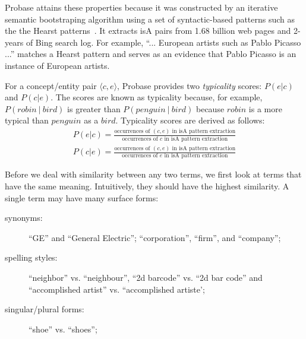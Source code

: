 Probase attains these properties because it was constructed by an
iterative semantic bootstraping algorithm using a set of
syntactic-based patterns such as the the Hearst
patterns~\cite{Hearst:Automatic}. It extracts isA pairs from 1.68
billion web pages and 2-years of Bing search log.
For example, ``... European artists such as Pablo Picasso ...'' matches a
Hearst pattern and serves as an evidence that Pablo Picasso is an instance of
European artists.

For a concept/entity pair $\langle c, e\rangle$, Probase provides
two {\it typicality} scores: $P(e|c)$ and $P(c|e)$.
The scores are known as typicality because, for example,
$P(robin~|~bird)$ is greater than $P(penguin~|~bird)$
because $robin$ is a more typical than $penguin$ as a $bird$.
Typicality scores are derived as follows:
\begin{displaymath}
{
\begin{aligned}
P(e|c) = \frac{\mbox{occurrences of }(c,e)\mbox{ in isA pattern extraction}}{\mbox{occurrences of }c\mbox{ in isA pattern extraction}}\\
P(c|e) = \frac{\mbox{occurrences of }(c,e)\mbox{ in isA pattern extraction}}{\mbox{occurrences of }e\mbox{ in isA pattern extraction}}
\end{aligned}
}
\end{displaymath}


Before we deal with similarity between any two terms, we first look at
terms that have the same meaning. Intuitively, they should have the
highest similarity.  A single term may have many surface forms:
\begin{description}
\item[synonyms:] ``GE'' and ``General Electric''; ``corporation'', ``firm'', and ``company'';
\item[spelling styles:] ``neighbor'' vs. ``neighbour'',
``2d barcode'' vs. ``2d bar code'' and  ``accomplished artist'' vs.
``accomplished artiste';
\item[singular/plural forms:] ``shoe'' vs. ``shoes'';
\end{description}

